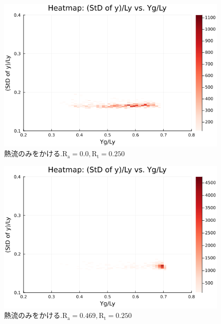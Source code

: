 \begin{figure}[H]
  \centering
  \includegraphics[scale=0.6]{image/g0_heat/2024-01-15T14:07:35.195_mapg0_chiinf_Ay50_rho0.4_T0.43_dT0.04_Rd0.0_Rt0.25_Ra0.0_g0_run4.0e7.png}
  \caption{$熱流のみをかける. \text{R}_\text{a}=0.0,\text{R}_\text{t}=0.250$}
  \label{}
\end{figure}

\begin{figure}[H]
  \centering
  \includegraphics[scale=0.6]{image/g0_heat/2024-01-15T14:07:35.278_mapg0_chiinf_Ay50_rho0.4_T0.43_dT0.04_Rd0.0_Rt0.25_Ra0.4693845_g0_run4.0e7.png}
  \caption{$熱流のみをかける. \text{R}_\text{a}=0.469,\text{R}_\text{t}=0.250$}
  \label{}
\end{figure}

